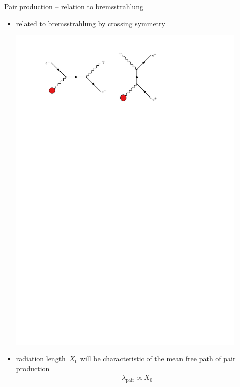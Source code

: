 \documentclass[11pt,xcolor=dvipsnames,professionalfonts,notes]{beamer}
\begin{document}
\begin{frame}{Pair production -- relation to bremsstrahlung}
	\begin{itemize}
		\setlength\itemsep{1.5em}
		\item related to bremsstrahlung by crossing symmetry
		
		\begin{center}
			\vspace{0.3cm}
			\includegraphics[width=0.9\textwidth]{./figures/crossing_symmetry.pdf}
		\end{center}
		
		\item radiation length~$X_0$ will be characteristic of the mean free path of pair production
		\begin{align*}
			\lambda_\mathrm{pair} \propto X_0
		\end{align*}
	\end{itemize}
\end{frame}
\end{document}
